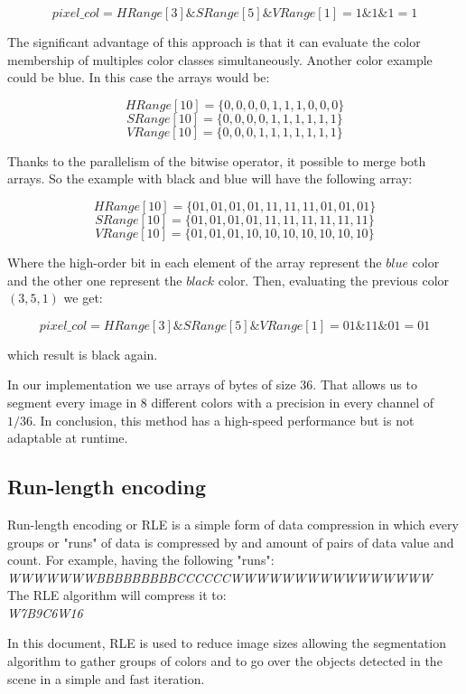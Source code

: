 \[ pixel\_col = HRange[3] \& SRange[5] \& VRange[1] = 1 \& 1 \& 1 = 1 \]

The significant advantage of this approach is that it can evaluate the color membership of multiples color classes simultaneously. Another color example could be blue. In this case the arrays would be:

{\centering
\[HRange[10] = \{0, 0, 0, 0, 1, 1, 1, 0, 0, 0\}\]
\[SRange[10] = \{0, 0, 0, 0, 1, 1, 1, 1, 1, 1\}\]
\[VRange[10] = \{0, 0, 0, 1, 1, 1, 1, 1, 1, 1\}\]
}

Thanks to the parallelism of the bitwise operator, it possible to merge both arrays. So the example with black and blue will have the following array:

{\centering
\[HRange[10] = \{01, 01, 01, 01, 11, 11, 11, 01, 01, 01\}\]
\[SRange[10] = \{01, 01, 01, 01, 11, 11, 11, 11, 11, 11\}\]
\[VRange[10] = \{01, 01, 01, 10, 10, 10, 10, 10, 10, 10\}\] 
} 

Where the high-order bit in each element  of the array represent the $blue$ color and the other one represent the $black$ color. Then, evaluating the previous color $(3,5,1)$ we get: 

\[pixel\_col = HRange[3] \& SRange[5] \& VRange[1] = 01 \& 11 \& 01 = 01\]

which result is black again.

In our implementation we use arrays of bytes of size 36. That allows us to segment every image in 8 different colors with a precision in every channel of $1/36$. In conclusion, this method has a high-speed performance but is not adaptable at runtime.

\subsection{Run-length encoding}
Run-length encoding or RLE is a simple form of data compression in which every groups or "runs" of data is compressed by and amount of pairs of data value and count. For example, having the following "runs": \\

\textit{WWWWWWWBBBBBBBBBCCCCCCWWWWWWWWWWWWWWWW} \\

The RLE algorithm will compress it to: \\
\textit{W7B9C6W16}

In this document, RLE is used to reduce image sizes allowing the segmentation algorithm to gather groups of colors and to go over the objects detected in the scene in a simple and fast iteration. \\

